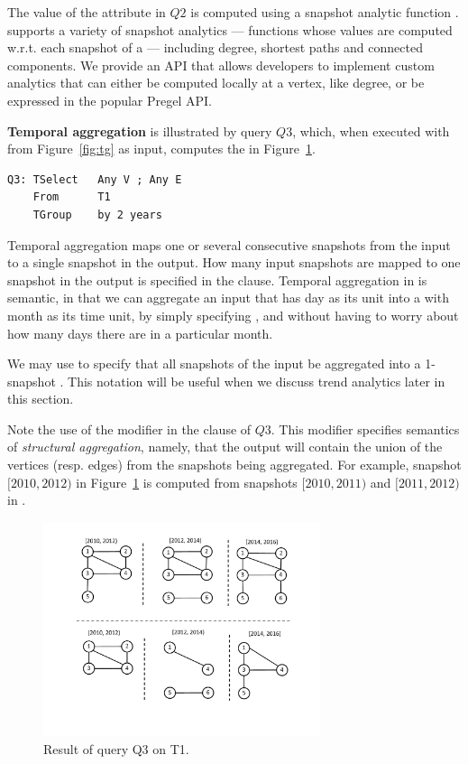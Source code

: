 The value of the attribute  in $Q2$ is computed using a
snapshot analytic function .  \ql supports a variety
of snapshot analytics --- functions whose values are computed
w.r.t. each snapshot of a \tg --- including degree, shortest paths and
connected components.  We provide an API that allows developers to
implement custom analytics that can either be computed locally at a
vertex, like degree, or be expressed in the popular Pregel API.

{\bf Temporal aggregation} is illustrated by query $Q3$, which, when
executed with  from Figure~\ref{fig:tg} as input, computes
the \tg in Figure~\ref{fig:q3}.

\begin{small}
\begin{verbatim}
Q3: TSelect   Any V ; Any E 
    From      T1
    TGroup    by 2 years
\end{verbatim}
\end{small}

Temporal aggregation maps one or several consecutive snapshots from
the input to a single snapshot in the output.  How many input
snapshots are mapped to one snapshot in the output is specified in the
 clause.  Temporal aggregation in \ql is semantic, in
that we can aggregate an input \tg that has day as its unit into a \tg
with month as its time unit, by simply specifying , and without having to worry about how many days there are in
a particular month.

We may use  to specify that all snapshots of the
input \tg be aggregated into a 1-snapshot \tg.  This notation will be
useful when we discuss trend analytics later in this section.

Note the use of the modifier  in the  clause
of $Q3$.  This modifier specifies semantics of {\em structural
  aggregation}, namely, that the output will contain the union of the
vertices (resp. edges) from the snapshots being aggregated.  For
example, snapshot $[2010, 2012)$ in Figure~\ref{fig:q3} is computed
  from snapshots $[2010, 2011)$ and $[2011, 2012)$ in .

\begin{figure}
\includegraphics[width=3.2in]{figs/TGroupAny.pdf}
\caption{Result of query Q3 on T1.}
\label{fig:q3}
\end{figure}

